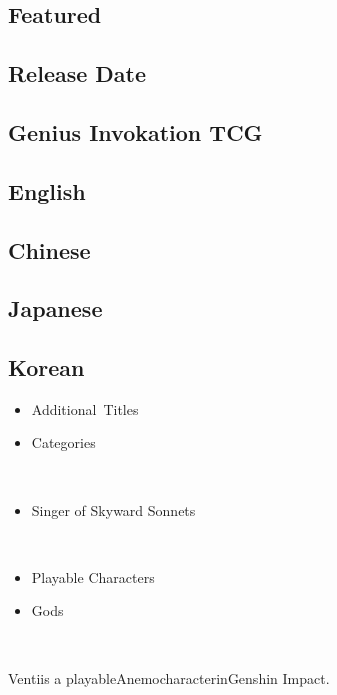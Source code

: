 \documentclass[a4paper,12pt]{article}
\begin{document}
\subsection*{Featured}\n\n\subsection*{Release Date}\n\n\subsection*{Genius Invokation TCG}\n\n\subsection*{English}\n\n\subsection*{Chinese}\n\n\subsection*{Japanese}\n\n\subsection*{Korean}\n\n\begin{itemize}
\item Additional Titles
\item Categories
\end{itemize}\\ \par \vspace{0.5cm}

\begin{itemize}
\item Singer of Skyward Sonnets
\end{itemize}\\ \par \vspace{0.5cm}

\begin{itemize}
\item Playable Characters
\item Gods
\end{itemize}\\ \par \vspace{0.5cm}

Ventiis a playableAnemocharacterinGenshin Impact.\\ \par \vspace{0.5cm}
\end{document}
